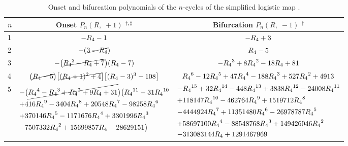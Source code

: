 \documentclass[preprint]{revtex4-1}
\begin{document}
\begin{table}[h]\footnotesize
  \caption{
  Onset and bifurcation polynomials %
  of the $n$-cycles of the simplified logistic map .}
\begin{center}
\begin{tabular}{lcc}
\hline
  $n$
& Onset $P_n(R, \; +1)$ $^{\dagger, \ddagger}$
& Bifurcation $P_n(R, \; -1)$ $^\dagger$
\\
\hline
1
&
$-{R_4}-1$
&
$-{R_4}+3$
\\
2
&
$-(\cancel{3-{R_4}})$
&
${R_4}-5$
\\
3
&
$\begin{aligned}
-
\big( \cancel{
  {R_4}^2-{R_4}+7
}\big)
  ({R_4}-7)
\end{aligned}$
&
$\begin{aligned}
 - {R_4}^3 + 8{R_4}^2 - 18{R_4} + 81
\end{aligned}$
\\
4
&
$\begin{aligned}
\big( \cancel{
  {R_4} - 5
} \big)
\big[ \cancel{
  ({R_4}+1)^2 + 4
} \big]
\big[
  ({R_4}-3)^3 - 108
\big]
\end{aligned}$

&

$
{R_4}^6-12 {R_4}^5+47 {R_4}^4-188 {R_4}^3+527 {R_4}^2+4913
$
\\
5

&

\begin{minipage}{.48\linewidth}
$\begin{aligned}
-
&\big( \cancel{
{R_4}^4-{R_4}^3+{R_4}^2+9 {R_4}+31
} \big)
\big(
{R_4}^{11}-31 {R_4}^{10} \\
+&416 {R_4}^9 -3404 {R_4}^8 +20548 {R_4}^7-98258 {R_4}^6 \\
+&370146 {R_4}^5 -1171676 {R_4}^4 +3301996 {R_4}^3\\
-&7507332 {R_4}^2+15699857 {R_4}-28629151
\big)
\end{aligned}$
\end{minipage}

&

\begin{minipage}{.49\linewidth}
\vspace{1mm}
$\begin{aligned}
-&{R_4}^{15}+32 {R_4}^{14}-448 {R_4}^{13}+3838 {R_4}^{12}-24008 {R_4}^{11}\\
+&118147 {R_4}^{10} -462764 {R_4}^9+1519712 {R_4}^8\\
-&4444924 {R_4}^7 +11351480 {R_4}^6 -26978787 {R_4}^5\\
+&58697100 {R_4}^4 -88548768 {R_4}^3+149426046 {R_4}^2\\
-&313083144 {R_4} +1291467969
\end{aligned}$
\vspace{1mm}
\end{minipage}


\end{tabular}
\end{center}
\end{table}
\end{document}
